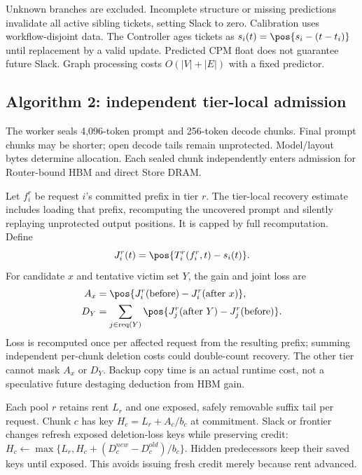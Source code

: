 Unknown branches are excluded. Incomplete structure or missing predictions
invalidate all active sibling tickets, setting Slack to zero. Calibration
uses workflow-disjoint data. The Controller ages tickets as
$s_i(t)=\pos{s_i-(t-t_i)}$ until replacement by a valid update.
Predicted CPM float does not guarantee future Slack. Graph processing costs
$O(|V|+|E|)$ with a fixed predictor.



\subsection{Algorithm 2: independent tier-local admission}
The worker seals 4,096-token prompt and 256-token decode chunks. Final prompt
chunks may be shorter; open decode tails remain unprotected. Model/layout
bytes determine allocation. Each sealed chunk independently enters admission
for Router-bound HBM and direct Store DRAM.

Let $f_i^r$ be request $i$'s committed prefix in tier $r$. The tier-local
recovery estimate includes loading that prefix, recomputing the uncovered
prompt and silently replaying unprotected output positions. It is capped
by full recomputation. Define
\begin{equation}
J_i^r(t)=\pos{T_i^r(f_i^r,t)-s_i(t)}.
\end{equation}
For candidate $x$ and tentative victim set $Y$, the gain and joint loss are
\begin{align}
A_x &= \pos{J_i^r(\mathrm{before})-J_i^r(\mathrm{after}\ x)},\\
D_Y &= \sum_{j\in\operatorname{req}(Y)}
       \pos{J_j^r(\mathrm{after}\ Y)-J_j^r(\mathrm{before})}.
\end{align}
Loss is recomputed once per affected request from the resulting prefix;
summing independent per-chunk deletion costs could double-count recovery.
The other tier cannot mask $A_x$ or $D_Y$. Backup copy time is an actual
runtime cost, not a speculative future destaging deduction from HBM gain.

Each pool $r$ retains rent $L_r$ and one exposed, safely removable suffix tail
per request. Chunk $c$ has key $H_c=L_r+A_c/b_c$ at commitment. Slack or
frontier changes refresh exposed deletion-loss keys while preserving credit:
$H_c\gets\max\{L_r,H_c+(D_c^{new}-D_c^{old})/b_c\}$. Hidden predecessors keep
their saved keys until exposed. This avoids issuing fresh credit merely
because rent advanced.

